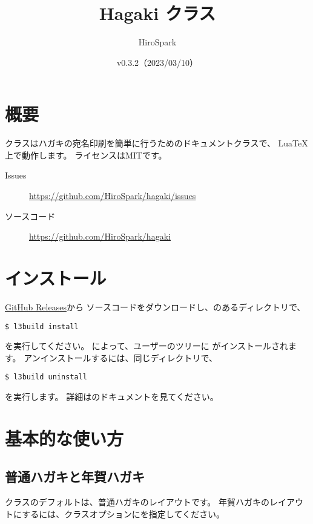 \documentclass{hagaki-doc}
\title{Hagaki クラス}
\author{HiroSpark}
\date{v0.3.2（2023/03/10）}
\begin{document}
\maketitle

\section{概要}

クラスはハガキの宛名印刷を簡単に行うためのドキュメントクラスで、
Lua\TeX{}上で動作します。
ライセンスはMITです。

\begin{description}
  \item[Issues] \url{https://github.com/HiroSpark/hagaki/issues}
  \item[ソースコード] \url{https://github.com/HiroSpark/hagaki}
\end{description}

\section{インストール}

\href{https://github.com/HiroSpark/hagaki/releases/}{GitHub Releases}から
ソースコードをダウンロードし、のあるディレクトリで、

\begin{lstlisting}
$ l3build install
\end{lstlisting}

を実行してください。
によって、ユーザーのツリーに
がインストールされます。
アンインストールするには、同じディレクトリで、

\begin{lstlisting}
$ l3build uninstall
\end{lstlisting}

を実行します。
詳細はのドキュメントを見てください。

\section{基本的な使い方}

\subsection{普通ハガキと年賀ハガキ}

クラスのデフォルトは、普通ハガキのレイアウトです。
年賀ハガキのレイアウトにするには、クラスオプションにを指定してください。
\end{document}
